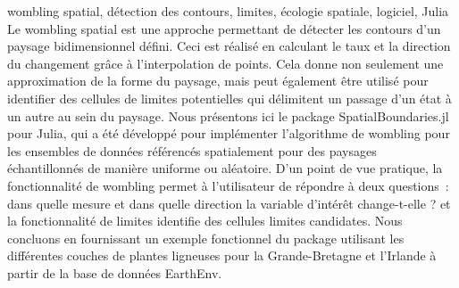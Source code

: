 \maketitle

\begin{resume}{wombling spatial, détection des contours, limites, écologie spatiale, logiciel, Julia} Le wombling spatial est une approche permettant de détecter les contours d’un paysage bidimensionnel défini. Ceci est réalisé en calculant le taux et la direction du changement grâce à l’interpolation de points. Cela donne non seulement une approximation de la forme du paysage, mais peut également être utilisé pour identifier des cellules de limites potentielles qui délimitent un passage d'un état à un autre au sein du paysage. Nous présentons ici le package SpatialBoundaries.jl pour Julia, qui a été développé pour implémenter l'algorithme de wombling pour les ensembles de données référencés spatialement pour des paysages échantillonnés de manière uniforme ou aléatoire. D'un point de vue pratique, la fonctionnalité de wombling permet à l'utilisateur de répondre à deux questions : dans quelle mesure et dans quelle direction la variable d’intérêt change-t-elle ? et la fonctionnalité de limites identifie des cellules limites candidates. Nous concluons en fournissant un exemple fonctionnel du package utilisant les différentes couches de plantes ligneuses pour la Grande-Bretagne et l'Irlande à partir de la base de données EarthEnv.
\end{resume}

\begin{abstract}{spatial wombling, edge detection, boundaries, spatial ecology, software, Julia} Spatial wombling is an approach for detecting edges within a defined two-dimensional landscape. This is achieved by calculating the rate and direction of change through the interpolation of points. This not only gives an approximation as to the shape of the landscape but can also be used to identify candidate boundaries cells that delimit a shift from one state to another within the landscape. Here we introduce the SpatialBoundaries.jl package for Julia, which has been developed to implement the wombling algorithm for datasets that are spatially referenced for both uniformly or randomly sampled landscapes.From a practical perspective, the wombling functionality allow the user to answer two questions: how much and in which direction does the variable of interest change? and the boundaries functionality identifies candidate boundary cells. We conclude by providing a working example of the package using the various woody plant layers for Britain and Ireland from the EarthEnv database.
\end{abstract}

